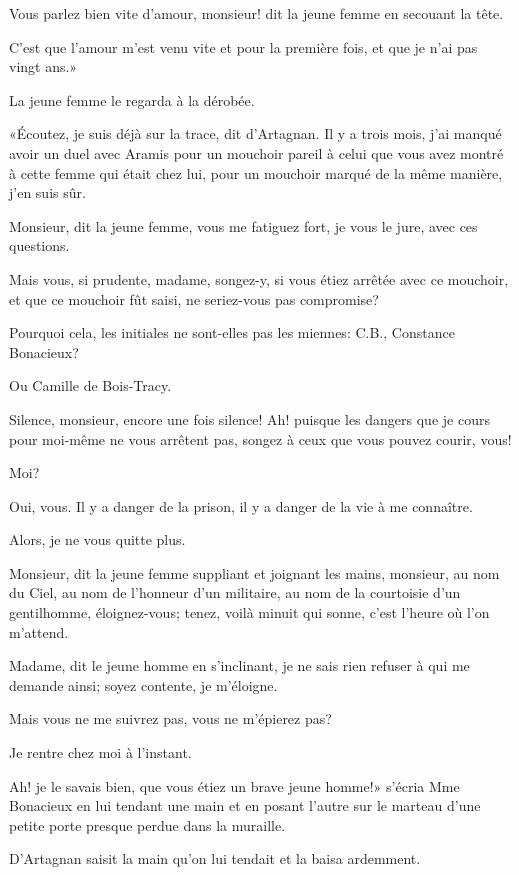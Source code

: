 \speak  Vous parlez bien vite d'amour, monsieur! dit la jeune femme en secouant la tête. 

\speak  C'est que l'amour m'est venu vite et pour la première fois, et que je n'ai pas vingt ans.» 

La jeune femme le regarda à la dérobée. 

«Écoutez, je suis déjà sur la trace, dit d'Artagnan. Il y a trois mois, j'ai manqué avoir un duel avec Aramis pour un mouchoir pareil à celui que vous avez montré à cette femme qui était chez lui, pour un mouchoir marqué de la même manière, j'en suis sûr. 

\speak  Monsieur, dit la jeune femme, vous me fatiguez fort, je vous le jure, avec ces questions. 

\speak  Mais vous, si prudente, madame, songez-y, si vous étiez arrêtée avec ce mouchoir, et que ce mouchoir fût saisi, ne seriez-vous pas compromise? 

\speak  Pourquoi cela, les initiales ne sont-elles pas les miennes: C.B., Constance Bonacieux? 

\speak  Ou Camille de Bois-Tracy. 

\speak  Silence, monsieur, encore une fois silence! Ah! puisque les dangers que je cours pour moi-même ne vous arrêtent pas, songez à ceux que vous pouvez courir, vous! 

\speak  Moi? 

\speak  Oui, vous. Il y a danger de la prison, il y a danger de la vie à me connaître. 

\speak  Alors, je ne vous quitte plus. 

\speak  Monsieur, dit la jeune femme suppliant et joignant les mains, monsieur, au nom du Ciel, au nom de l'honneur d'un militaire, au nom de la courtoisie d'un gentilhomme, éloignez-vous; tenez, voilà minuit qui sonne, c'est l'heure où l'on m'attend. 

\speak  Madame, dit le jeune homme en s'inclinant, je ne sais rien refuser à qui me demande ainsi; soyez contente, je m'éloigne. 

\speak  Mais vous ne me suivrez pas, vous ne m'épierez pas? 

\speak  Je rentre chez moi à l'instant. 

\speak  Ah! je le savais bien, que vous étiez un brave jeune homme!» s'écria Mme Bonacieux en lui tendant une main et en posant l'autre sur le marteau d'une petite porte presque perdue dans la muraille. 

D'Artagnan saisit la main qu'on lui tendait et la baisa ardemment. 

